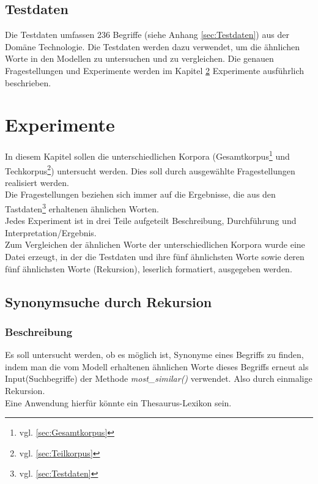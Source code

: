 \documentclass[12pt,a4paper]{report}
\begin{document}
	
	\section{Testdaten}
	Die Testdaten umfassen 236 Begriffe (siehe Anhang \ref{sec:Testdaten}) aus der Domäne Technologie. Die Testdaten werden dazu verwendet, um die ähnlichen Worte in den Modellen zu untersuchen und zu vergleichen. Die genauen Fragestellungen und Experimente werden im Kapitel \ref{chap:Experimente} Experimente ausführlich beschrieben.
	
	
\newpage
\chapter{Experimente}
\label{chap:Experimente}
In diesem Kapitel sollen die unterschiedlichen Korpora (Gesamtkorpus\footnote{vgl. \ref{sec:Gesamtkorpus}} und Techkorpus\footnote{vgl. \ref{sec:Teilkorpus}}) untersucht werden. Dies soll durch ausgewählte Fragestellungen realisiert werden.
\\Die Fragestellungen beziehen sich immer auf die Ergebnisse, die aus den Tastdaten\footnote{vgl. \ref{sec:Testdaten}} erhaltenen ähnlichen Worten.
\\Jedes Experiment ist in drei Teile aufgeteilt Beschreibung, Durchführung und Interpretation/Ergebnis.\\
Zum Vergleichen der ähnlichen Worte der unterschiedlichen Korpora wurde eine Datei erzeugt, in der die Testdaten und ihre fünf ähnlichsten Worte sowie deren fünf ähnlichsten Worte (Rekursion), leserlich formatiert, ausgegeben werden.\\ 

	\section{Synonymsuche durch Rekursion}
		\subsection{Beschreibung}
		Es soll untersucht werden, ob es möglich ist, Synonyme eines Begriffs zu finden, indem man die vom Modell erhaltenen ähnlichen Worte dieses Begriffs erneut als Input(Suchbegriffe) der Methode  \textit{most\_similar()} verwendet. Also durch einmalige Rekursion.\\
Eine Anwendung hierfür könnte ein Thesaurus-Lexikon sein.

		
		
\end{document}
